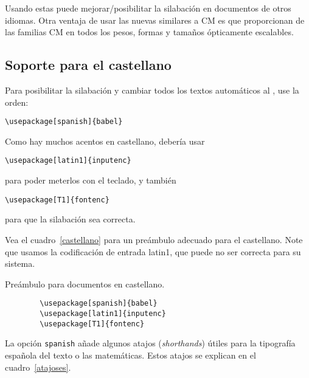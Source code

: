 Usando estas \fontsnomo{} puede mejorar/posibilitar la silabación en documentos de otros idiomas.  Otra ventaja de usar las nuevas \fontsnomo{} similares a CM es que proporcionan \fontsnomo{} de las familias CM en todos los pesos, formas y tamaños ópticamente escalables.

\subsection{Soporte para el castellano}


Para posibilitar la silabación y cambiar todos los textos automáticos al ,   use la orden: 
\begin{lscommand}
\verb|\usepackage[spanish]{babel}|
\end{lscommand}

Como hay muchos acentos en castellano, debería usar
\begin{lscommand}
\verb|\usepackage[latin1]{inputenc}|
\end{lscommand}
para poder meterlos con el teclado, y también
\begin{lscommand}
\verb|\usepackage[T1]{fontenc}|
\end{lscommand}
para que la silabación sea correcta.

Vea el cuadro~\ref{castellano} para un preámbulo adecuado para el castellano.  Note que usamos la codificación de entrada latin1, que puede no ser correcta para su sistema.

\begin{table}[btp]
\caption{Preámbulo para documentos en castellano.} \label{castellano}
    \begin{lined}{5cm}
        \begin{verbatim}
        \usepackage[spanish]{babel}
        \usepackage[latin1]{inputenc}
        \usepackage[T1]{fontenc}
        \end{verbatim}
    \bigskip
    \end{lined}
\end{table}

La opción \verb|spanish| añade algunos atajos (\emph{shorthands}) útiles para la tipografía española del texto o las matemáticas. Estos atajos se explican en el cuadro~\ref{atajoses}.

\newcommand\nm[1]{\unskip\,$^{#1}$}
\newcommand\nt[1]{\quad$^{#1}$\,\ignorespaces}
\newcommand\toprule[1]{\cline{1-#1}\\[-2ex]}
\newcommand\botrule[1]{\\[.6ex]\cline{1-#1}}

